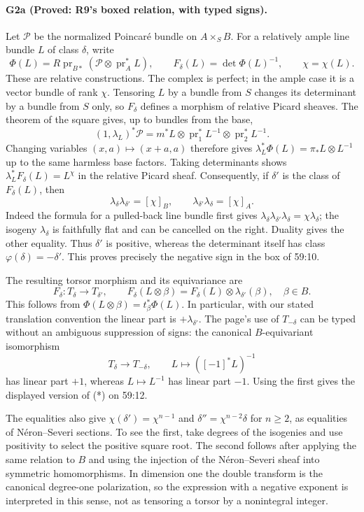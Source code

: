 \paragraph{G2a (Proved: R9's boxed relation, with typed signs).}
Let $\mathcal P$ be the normalized Poincaré bundle on $A\times_S B$.
For a relatively ample line bundle $L$ of class $\delta$, write
\[
 \Phi(L)=R\operatorname{pr}_{B*}
       (\mathcal P\otimes\operatorname{pr}_A^*L),\qquad
 F_\delta(L)=\det\Phi(L)^{-1},\qquad \chi=\chi(L).
\]
These are relative constructions.  The complex is perfect; in the
ample case it is a vector bundle of rank $\chi$.  Tensoring $L$ by a
bundle from $S$ changes its determinant by a bundle from $S$ only,
so $F_\delta$ defines a morphism of relative Picard sheaves.
The theorem of the square gives, up to bundles from the base,
\[
 (1,\lambda_L)^*\mathcal P
   =m^*L\otimes\operatorname{pr}_1^*L^{-1}
          \otimes\operatorname{pr}_2^*L^{-1}.
\]
Changing variables $(x,a)\mapsto(x+a,a)$ therefore gives
$\lambda_L^*\Phi(L)=\pi_*L\otimes L^{-1}$ up to the same harmless
base factors.  Taking determinants shows
$\lambda_L^*F_\delta(L)=L^\chi$ in the relative Picard sheaf.
Consequently, if $\delta'$ is the class of $F_\delta(L)$, then
\[
 \lambda_\delta\lambda_{\delta'}=[\chi]_B,
 \qquad
 \lambda_{\delta'}\lambda_\delta=[\chi]_A.
\]
Indeed the formula for a pulled-back line bundle first gives
$\lambda_\delta\lambda_{\delta'}\lambda_\delta
=\chi\lambda_\delta$; the isogeny $\lambda_\delta$ is faithfully flat
and can be cancelled on the right.  Duality gives the other equality.
Thus $\delta'$ is positive, whereas the determinant itself has class
$\varphi(\delta)=-\delta'$.  This proves precisely the negative sign
in the box of 59:10.

The resulting torsor morphism and its equivariance are
\[
 F_\delta:T_\delta\longrightarrow T_{\delta'},\qquad
 F_\delta(L\otimes\beta)=F_\delta(L)\otimes\lambda_{\delta'}(\beta),
 \quad \beta\in B.
\]
This follows from
$\Phi(L\otimes\beta)=t_\beta^*\Phi(L)$.
In particular, with our stated translation convention the linear
part is $+\lambda_{\delta'}$.  The page's use of $T_{-\delta}$ can be
typed without an ambiguous suppression of signs: the canonical
$B$-equivariant isomorphism
\[
 T_\delta\longrightarrow T_{-\delta},\qquad
 L\longmapsto([-1]^*L)^{-1}
\]
has linear part $+1$, whereas $L\mapsto L^{-1}$ has linear part $-1$.
Using the first gives the displayed version of (*) on 59:12.

The equalities also give
$\chi(\delta')=\chi^{n-1}$ and
$\delta''=\chi^{n-2}\delta$ for $n\geq2$, as equalities of
Néron--Severi sections.  To see the first, take degrees of the
isogenies and use positivity to select the positive square root.
The second follows after applying the same relation to $B$ and
using the injection of the Néron--Severi sheaf into symmetric
homomorphisms.  In dimension one the double transform is the
canonical degree-one polarization, so the expression with a negative
exponent is interpreted in this sense, not as tensoring a torsor
by a nonintegral integer.

